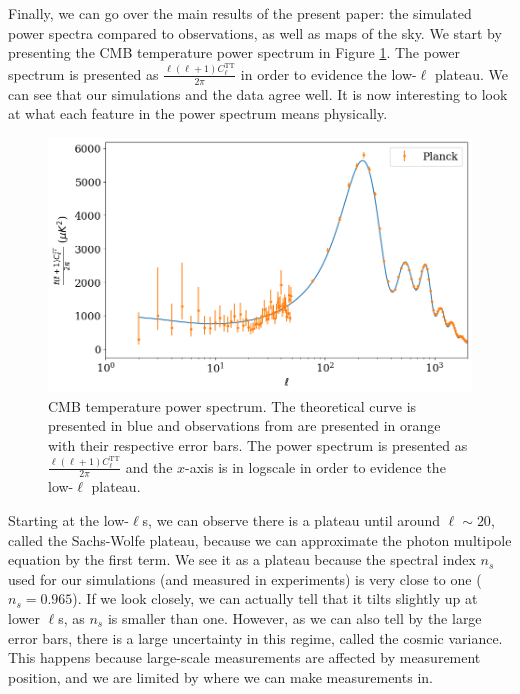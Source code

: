 \documentclass{aa}
\begin{document}
Finally, we can go over the main results of the present paper: the simulated power spectra compared to observations, as well as maps of the sky. We start by presenting the CMB temperature power spectrum in Figure \ref{fig:ps-tt}. The power spectrum is presented as $\frac{\ell(\ell+1)C_\ell^\text{TT}}{2\pi}$ in order to evidence the low-$\ell$ plateau. We can see that our simulations and the data agree well. It is now interesting to look at what each feature in the power spectrum means physically.

\begin{figure}[ht]
    \centering
    \includegraphics[width=\linewidth]{report/figures/power_spectrum_TT.png}
    \caption{CMB temperature power spectrum. The theoretical curve is presented in blue and observations from \cite{2020} are presented in orange with their respective error bars. The power spectrum is presented as $\frac{\ell(\ell+1)C_\ell^\text{TT}}{2\pi}$ and the $x$-axis is in logscale in order to evidence the low-$\ell$ plateau.}
    \label{fig:ps-tt}
\end{figure}

Starting at the low-$\ell$s, we can observe there is a plateau until around $\ell\sim20$, called the Sachs-Wolfe plateau, because we can approximate the photon multipole equation by the first term. We see it as a plateau because the spectral index $n_s$ used for our simulations (and measured in experiments) is very close to one ($n_s=0.965$). If we look closely, we can actually tell that it tilts slightly up at lower $\ell$s, as $n_s$ is smaller than one. However, as we can also tell by the large error bars, there is a large uncertainty in this regime, called the cosmic variance. This happens because large-scale measurements are affected by measurement position, and we are limited by where we can make measurements in.
\end{document}
